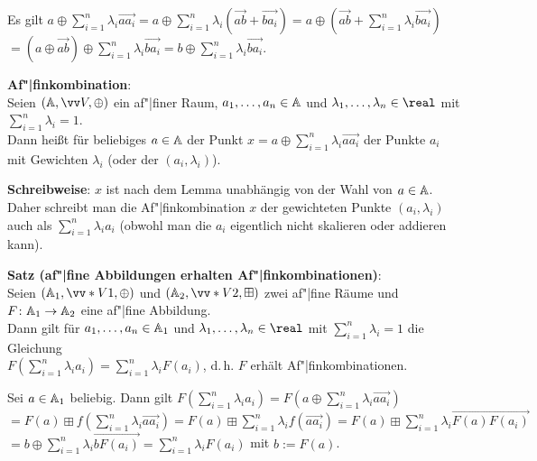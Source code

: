 \begin{Beweis}
    Es gilt
    $a \oplus \sum_{i=1}^n \lambda_i \vec{aa_i}
    = a \oplus \sum_{i=1}^n \lambda_i (\vec{ab} + \vec{ba_i})
    = a \oplus (\vec{ab} + \sum_{i=1}^n \lambda_i \vec{ba_i})$\\
    $= (a \oplus \vec{ab}) \oplus \sum_{i=1}^n \lambda_i \vec{ba_i}
    = b \oplus \sum_{i=1}^n \lambda_i \vec{ba_i}$.
\end{Beweis}

\linie

\textbf{Af"|finkombination}:\\
Seien $(\AA, \vec{V}, \oplus)$ ein af"|finer Raum,
$a_1, \dotsc, a_n \in \AA$ und $\lambda_1, \dotsc, \lambda_n \in \real$
mit $\sum_{i=1}^n \lambda_i = 1$.\\
Dann heißt für beliebiges $a \in \AA$
der Punkt $x = a \oplus \sum_{i=1}^n \lambda_i \vec{aa_i}$ 
der Punkte $a_i$ mit Gewichten $\lambda_i$
(oder der  $(a_i, \lambda_i)$).

\textbf{Schreibweise}:
$x$ ist nach dem Lemma unabhängig von der Wahl von $a \in \AA$.
Daher schreibt man die Af"|finkombination $x$ der gewichteten Punkte $(a_i, \lambda_i)$ auch
als $\sum_{i=1}^n \lambda_i a_i$
(obwohl man die $a_i$ eigentlich nicht skalieren oder addieren kann).

\linie

\textbf{Satz (af"|fine Abbildungen erhalten Af"|finkombinationen)}:\\
Seien $(\AA_1, \vecs{V}{1}, \oplus)$ und $(\AA_2, \vecs{V}{2}, \boxplus)$ zwei af"|fine Räume
und $F\colon \AA_1 \to \AA_2$ eine af"|fine Abbildung.\\
Dann gilt für $a_1, \dotsc, a_n \in \AA_1$ und $\lambda_1, \dotsc, \lambda_n \in \real$
mit $\sum_{i=1}^n \lambda_i = 1$
die Gleichung\\
$F(\sum_{i=1}^n \lambda_i a_i) = \sum_{i=1}^n \lambda_i F(a_i)$,
d.\,h. $F$ erhält Af"|finkombinationen.

\begin{Beweis}
    Sei $a \in \AA_1$ beliebig.
    Dann gilt
    $F(\sum_{i=1}^n \lambda_i a_i)
    = F(a \oplus \sum_{i=1}^n \lambda_i \vec{aa_i})$\\
    $= F(a) \boxplus f(\sum_{i=1}^n \lambda_i \vec{aa_i})
    = F(a) \boxplus \sum_{i=1}^n \lambda_i f(\vec{aa_i})
    = F(a) \boxplus \sum_{i=1}^n \lambda_i \vec{F(a)F(a_i)}$\\
    $= b \oplus \sum_{i=1}^n \lambda_i \vec{b F(a_i)}
    = \sum_{i=1}^n \lambda_i F(a_i)$
    mit $b := F(a)$.
\end{Beweis}

